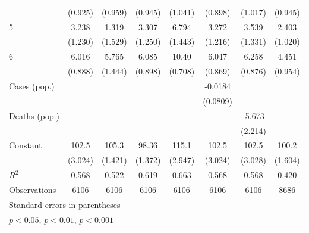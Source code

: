 \documentclass{article}
\begin{document}
{\begin{longtable}{l*{7}{c}}
                &  (0.925)         &  (0.959)         &  (0.945)         &  (1.041)         &  (0.898)         &  (1.017)         &  (0.945)         \\
5               &    3.238\sym{*}  &    1.319         &    3.307\sym{*}  &    6.794\sym{***}&    3.272\sym{*}  &    3.539\sym{*}  &    2.403\sym{*}  \\
                &  (1.230)         &  (1.529)         &  (1.250)         &  (1.443)         &  (1.216)         &  (1.331)         &  (1.020)         \\
6               &    6.016\sym{***}&    5.765\sym{***}&    6.085\sym{***}&    10.40\sym{***}&    6.047\sym{***}&    6.258\sym{***}&    4.451\sym{***}\\
                &  (0.888)         &  (1.444)         &  (0.898)         &  (0.708)         &  (0.869)         &  (0.876)         &  (0.954)         \\
Cases (pop.)    &                  &                  &                  &                  &  -0.0184         &                  &                  \\
                &                  &                  &                  &                  & (0.0809)         &                  &                  \\
Deaths (pop.)   &                  &                  &                  &                  &                  &   -5.673\sym{*}  &                  \\
                &                  &                  &                  &                  &                  &  (2.214)         &                  \\
Constant        &    102.5\sym{***}&    105.3\sym{***}&    98.36\sym{***}&    115.1\sym{***}&    102.5\sym{***}&    102.5\sym{***}&    100.2\sym{***}\\
                &  (3.024)         &  (1.421)         &  (1.372)         &  (2.947)         &  (3.024)         &  (3.028)         &  (1.604)         \\
\hline
\(R^{2}\)       &    0.568         &    0.522         &    0.619         &    0.663         &    0.568         &    0.568         &    0.420         \\
Observations    &     6106         &     6106         &     6106         &     6106         &     6106         &     6106         &     8686         \\
\hline\hline
\multicolumn{8}{l}{\footnotesize Standard errors in parentheses}\\
\multicolumn{8}{l}{\footnotesize \sym{*} \(p<0.05\), \sym{**} \(p<0.01\), \sym{***} \(p<0.001\)}\\
\end{longtable}
}
\end{document}

